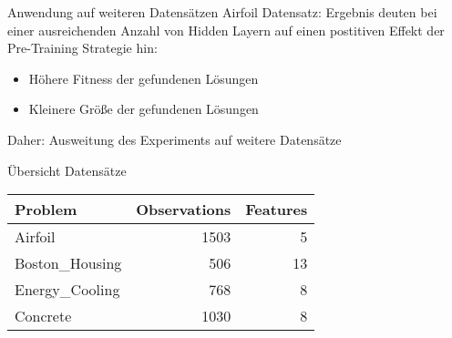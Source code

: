 \documentclass[
  ignorenonframetext,
]{beamer}
\providecommand{\tightlist}{%
  \setlength{\itemsep}{0pt}\setlength{\parskip}{0pt}}
\begin{document}
\begin{frame}{Anwendung auf weiteren Datensätzen}
\protect\hypertarget{anwendung-auf-weiteren-datensuxe4tzen}{}
Airfoil Datensatz: Ergebnis deuten bei einer ausreichenden Anzahl von
Hidden Layern auf einen postitiven Effekt der Pre-Training Strategie
hin:

\begin{itemize}
\tightlist
\item
  Höhere Fitness der gefundenen Lösungen
\item
  Kleinere Größe der gefundenen Lösungen
\end{itemize}

Daher: Ausweitung des Experiments auf weitere Datensätze
\end{frame}

\begin{frame}{Übersicht Datensätze}
\protect\hypertarget{uxfcbersicht-datensuxe4tze}{}
\begin{table}[!h]
\centering
\begin{tabular}{l|r|r}
\hline
\textbf{Problem} & \textbf{Observations} & \textbf{Features}\\
\hline
Airfoil & 1503 & 5\\
\hline
Boston\_Housing & 506 & 13\\
\hline
Energy\_Cooling & 768 & 8\\
\hline
Concrete & 1030 & 8\\
\hline
\end{tabular}
\end{table}
\end{frame}
\end{document}

